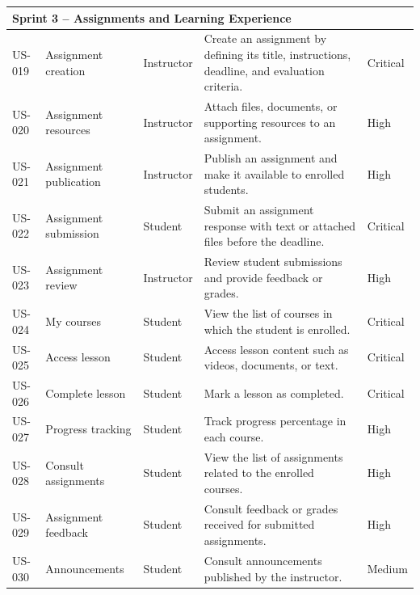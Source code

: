 \begin{longtable}{|p{1.3cm}|p{3cm}|p{2.4cm}|p{7.2cm}|p{1.7cm}|}
  \multicolumn{5}{|l|}{\cellcolor{gray!15}\textbf{Sprint 3 -- Assignments and Learning Experience}} \\
  \hline
  US-019 & Assignment creation & Instructor & Create an assignment by defining its title, instructions, deadline, and evaluation criteria. & Critical \\
  \hline
  US-020 & Assignment resources & Instructor & Attach files, documents, or supporting resources to an assignment. & High \\
  \hline
  US-021 & Assignment publication & Instructor & Publish an assignment and make it available to enrolled students. & High \\
  \hline
  US-022 & Assignment submission & Student & Submit an assignment response with text or attached files before the deadline. & Critical \\
  \hline
  US-023 & Assignment review & Instructor & Review student submissions and provide feedback or grades. & High \\
  \hline
  US-024 & My courses & Student & View the list of courses in which the student is enrolled. & Critical \\
  \hline
  US-025 & Access lesson & Student & Access lesson content such as videos, documents, or text. & Critical \\
  \hline
  US-026 & Complete lesson & Student & Mark a lesson as completed. & Critical \\
  \hline
  US-027 & Progress tracking & Student & Track progress percentage in each course. & High \\
  \hline
  US-028 & Consult assignments & Student & View the list of assignments related to the enrolled courses. & High \\
  \hline
  US-029 & Assignment feedback & Student & Consult feedback or grades received for submitted assignments. & High \\
  \hline
  US-030 & Announcements & Student & Consult announcements published by the instructor. & Medium \\
  \hline


\end{longtable}
